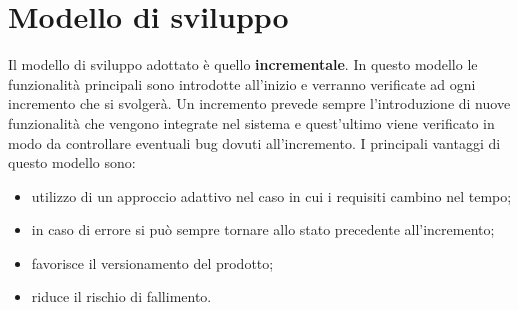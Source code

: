 \section{Modello di sviluppo}
Il modello di sviluppo adottato è quello \textbf{incrementale}. In questo
modello le funzionalità principali sono introdotte all'inizio e verranno verificate
ad ogni incremento che si svolgerà. Un incremento prevede sempre l'introduzione di nuove
funzionalità che vengono integrate nel sistema e quest'ultimo viene verificato in modo da
controllare eventuali bug dovuti all'incremento. I principali vantaggi di questo modello sono:
\begin{itemize}
    \item utilizzo di un approccio adattivo nel caso in cui i requisiti cambino nel tempo;
    \item in caso di errore si può sempre tornare allo stato precedente all'incremento;
    \item favorisce il versionamento del prodotto;
    \item riduce il rischio di fallimento.
\end{itemize}